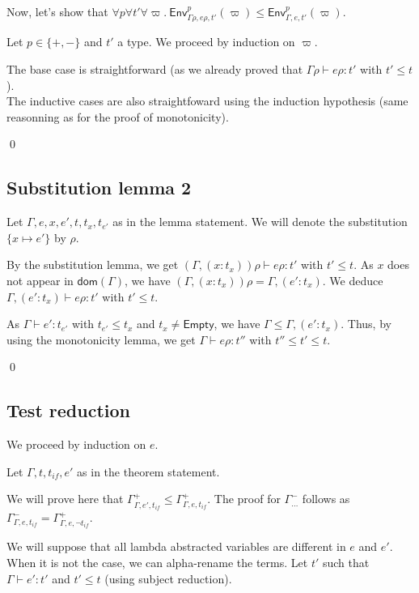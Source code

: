 \documentclass[a4paper]{article}%
\newcommand{\dom}[1]{\textsf{dom}(#1)}
\newcommand{\Empty} {\textsf{Empty}}%
\newcommand{\subst}[2]{\{#1 \mapsto #2\}}
\newcommand{\Gp}[2]{\textsf{Env}^{#1}_{#2}}
\theoremstyle{definition}
\begin{document}
    Now, let's show that $\forall p \forall t' \forall \varpi.\ \Gp p {\Gamma\rho,e\rho,t'} (\varpi) \leq \Gp p {\Gamma,e,t'} (\varpi)$.

    Let $p\in \{+,-\}$ and $t'$ a type.
    We proceed by induction on $\varpi$.

    The base case is straightforward (as we already proved that $\Gamma \rho \vdash e \rho:t'$ with $t'\leq t$).\\
    The inductive cases are also straightfoward using the induction hypothesis (same reasonning as for the proof of monotonicity).

    \qed

    \subsection{Substitution lemma 2}

    Let $\Gamma,e,x,e',t,t_x,t_{e'}$ as in the lemma statement.
    We will denote the substitution $\subst x {e'}$ by $\rho$.

    By the substitution lemma, we get $(\Gamma, (x:t_x))\rho \vdash e\rho:t'$ with $t' \leq t$.
    As $x$ does not appear in $\dom \Gamma$, we have $(\Gamma, (x:t_x))\rho = \Gamma, (e':t_x)$.
    We deduce $\Gamma, (e':t_x) \vdash e\rho:t'$ with $t' \leq t$.

    As $\Gamma \vdash e':t_{e'}$ with $t_{e'} \leq t_x$ and $t_x \neq \Empty$, we have $\Gamma \leq \Gamma, (e':t_x)$.
    Thus, by using the monotonicity lemma, we get $\Gamma\vdash e\rho:t''$ with $t'' \leq t' \leq t$.

    \qed

    \subsection{Test reduction}

    We proceed by induction on $e$.

    Let $\Gamma,t,t_{if},e'$ as in the theorem statement.
    
    We will prove here that $\Gamma^+_{\Gamma,e',t_{if}} \leq \Gamma^+_{\Gamma,e,t_{if}}$.
    The proof for $\Gamma^-_{\dots}$ follows as $\Gamma^-_{\Gamma,e,t_{if}}=\Gamma^+_{\Gamma,e,\neg t_{if}}$.

    We will suppose that all lambda abstracted variables are different in $e$ and $e'$. When it is not the case, we can alpha-rename the terms.
    Let $t'$ such that $\Gamma \vdash e':t'$ and $t'\leq t$ (using subject reduction).
\end{document}
